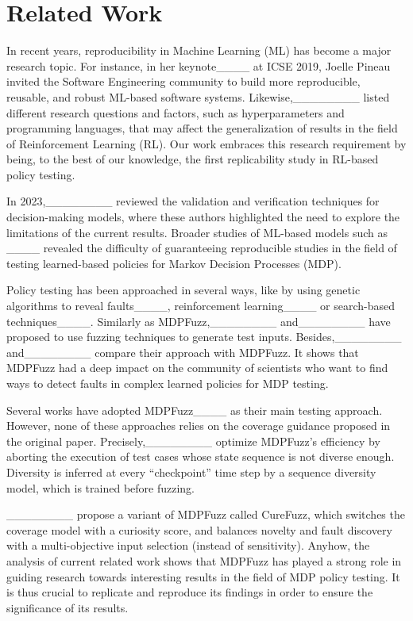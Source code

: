\section{Related Work}
In recent years, reproducibility in Machine Learning (ML) has become a major research topic. 
For instance, in her keynote____ at ICSE 2019, Joelle Pineau invited the Software Engineering community to build more reproducible, reusable, and robust ML-based software systems. 
Likewise,________ listed different research questions and factors, such as hyperparameters and programming languages, that may affect the generalization of results in the field of Reinforcement Learning (RL).
Our work embraces this research requirement by being, to the best of our knowledge, the first replicability study in RL-based policy testing.

In 2023,________ reviewed the validation and verification techniques for decision-making models, where these authors highlighted the need to explore the limitations of the current results.
Broader studies of ML-based models such as ____ revealed the difficulty of guaranteeing reproducible studies in the field of testing learned-based policies for Markov Decision Processes (MDP).

Policy testing has been approached in several ways, like by using genetic algorithms to reveal faults____, reinforcement learning____ or search-based techniques____.
Similarly as MDPFuzz,________ and________ have proposed to use fuzzing techniques to generate test inputs.
Besides,________ and________ compare their approach with MDPFuzz. 
It shows that MDPFuzz had a deep impact on the community of scientists who want to find ways to detect faults in complex learned policies for MDP testing. 

Several works have adopted MDPFuzz____ as their main testing approach.
However, none of these approaches relies on the coverage guidance proposed in the original paper.
Precisely,________ optimize MDPFuzz's efficiency by aborting the execution of test cases whose state sequence is not diverse enough.
Diversity is inferred at every ``checkpoint'' time step by a sequence diversity model, which is trained before fuzzing.

________ propose a variant of MDPFuzz called CureFuzz, which switches the coverage model with a curiosity score, and balances novelty and fault discovery with a multi-objective input selection (instead of sensitivity).
Anyhow, the analysis of current related work shows that MDPFuzz has played a strong role in guiding research towards interesting results in the field of MDP policy testing. 
It is thus crucial to replicate and reproduce its findings in order to ensure the significance of its results.